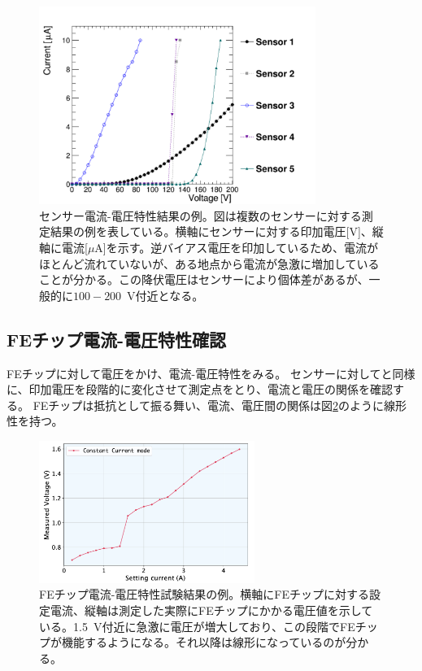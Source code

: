 \begin{figure}[bpt]\centering
\includegraphics[width=9cm]{./sensor_IV_result.pdf}
\caption[センサー電流-電圧特性結果の例]{センサー電流-電圧特性結果の例\cite{3-6}。図は複数のセンサーに対する測定結果の例を表している。横軸にセンサーに対する印加電圧[V]、縦軸に電流[$\mu$A]を示す。逆バイアス電圧を印加しているため、電流がほとんど流れていないが、ある地点から電流が急激に増加していることが分かる。この降伏電圧はセンサーにより個体差があるが、一般的に$100-200$~V付近となる。}
\label{sensor_IV_result}
\end{figure}

\subsection{FEチップ電流-電圧特性確認}
FEチップに対して電圧をかけ、電流-電圧特性をみる。
センサーに対してと同様に、印加電圧を段階的に変化させて測定点をとり、電流と電圧の関係を確認する。
FEチップは抵抗として振る舞い、電流、電圧間の関係は図\ref{SLDO_VI_result}のように線形性を持つ。

\begin{figure}[bpt]\centering
\includegraphics[width=7cm]{./SLDO_VI_result.png}
\caption[FEチップ電流-電圧特性試験結果の例。]{FEチップ電流-電圧特性試験結果の例\cite{3-4}。横軸にFEチップに対する設定電流、縦軸は測定した実際にFEチップにかかる電圧値を示している。1.5~V付近に急激に電圧が増大しており、この段階でFEチップが機能するようになる。それ以降は線形になっているのが分かる。}
\label{SLDO_VI_result}
\end{figure}

